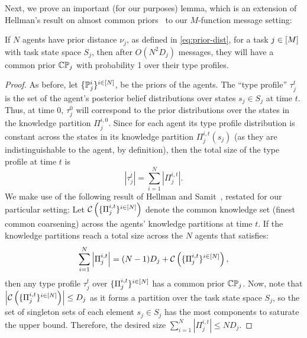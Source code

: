 Next, we prove an important (for our purposes) lemma, which is an extension of Hellman's result on almost common priors~\citep[Theorem 2]{hellman2013almost} to our $M$-function message setting:
\begin{lemma}\label{lem:common-prior}
If $N$ agents have prior distance $\nu_j$, as defined in \eqref{eq:prior-dist}, for a task $j\in [M]$ with task state space $S_j$, then after $O\left(N^2 D_j \right)$ messages, they will have a common prior $\mathbb{C}\mathbb{P}_j$ with probability 1 over their type profiles.
\end{lemma}
\begin{proof}
As before, let $\{\mathbb{P}_j^i\}^{i \in [N]}$, be the priors of the agents.
The ``type profile'' $\tau^t_j$ is the set of the agent's posterior belief distributions over states $s_j \in S_j$ at time $t$.
Thus, at time 0, $\tau^0_j$ will correspond to the prior distributions over the states in the knowledge partition $\Pi_j^{i,  0}$.
Since for each agent its type profile distribution is constant across the states in its knowledge partition $\Pi_j^{i, t}(s_j)$ (as they are indistinguishable to the agent, by definition), then the total size of the type profile at time $t$ is
\begin{equation}\label{eq:type-size}
|\tau^t_j| = \sum_{i = 1}^N \left|\Pi_j^{i, t}\right|.
\end{equation}
We make use of the following result of Hellman and Samit~\citep[Proposition 2]{hellman2012common}, restated for our particular setting:
Let $\mathcal{C}\left(\{\Pi_j^{i,t}\}^{i \in [N]}\right)$ denote the common knowledge set (finest common coarsening) across the agents' knowledge partitions at time $t$.
If the knowledge partitions reach a total size across the $N$ agents that satisfies:
\begin{equation}\label{eq:cp-size}
\sum_{i=1}^N \left|\Pi_j^{i, t}\right| = (N - 1)D_j + \mathcal{C}\left(\{\Pi_j^{i,t}\}^{i \in [N]}\right),
\end{equation}
then any type profile $\tau^t_j$ over $\{\Pi_j^{i,t}\}^{i \in [N]}$ has a common prior $\mathbb{C}\mathbb{P}_j$.
Now, note that $\left|\mathcal{C}\left(\{\Pi_j^{i,t}\}^{i \in [N]}\right)\right| \le D_j$ as it forms a partition over the task state space $S_j$, so the set of singleton sets of each element $s_j \in S_j$ has the most components to saturate the upper bound.
Therefore, the desired size $\sum_{i=1}^N \left|\Pi_j^{i, t}\right| \le ND_j$.


\end{proof}
